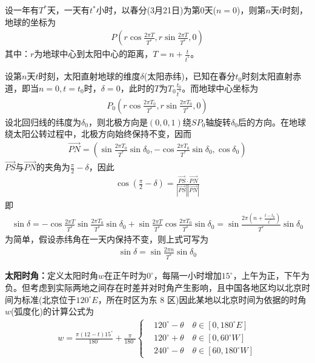             设一年有$T^*$天，一天有$t^*$小时，以春分(3月21日)为第0天($n=0$)，则第$n$天$t$时刻，地球的坐标为
            \begin{align*}
            P(r\cos\frac{2\pi T}{T^*},r\sin \frac{2\pi T}{T^*},0)
            \end{align*}
            其中：$r$为地球中心到太阳中心的距离，$T = n+\frac{t}{t^*}$。
            \par
            设第$n$天$t$时刻，太阳直射地球的维度$\delta$(太阳赤纬)，已知在春分$t_0$时刻太阳直射赤道，即当$n=0,t=t_0$时，$\delta=0$，此时的$T$为$T_0\frac{t_0}{t^*}$。而地球中心坐标为
            \begin{align*}
            P_0(r\cos\frac{2\pi T_0}{T^*},r\sin \frac{2\pi T_0}{T^*},0)
            \end{align*}
            设北回归线的纬度为$\delta_0$，则北极方向是$(0,0,1)$绕$SP_0$轴旋转$\delta_0$后的方向。在地球绕太阳公转过程中，北极方向始终保持不变，因而
            \begin{align*}
            \overrightarrow{PN} = \left( \sin \frac{2\pi T_0}{T^*}\sin\delta_0,-\cos\frac{2\pi T_0}{T^*}\sin\delta_0,\cos\delta_0 \right)
            \end{align*}
            $\overrightarrow{PS}$与$\overrightarrow{PN}$的夹角为$\frac{\pi}{2}-\delta$，因此
            \begin{align*}
            \cos(\frac{\pi}{2}-\delta) = \frac{\overrightarrow{PS}\cdot\overrightarrow {PN}}{|\overrightarrow{PS}||\overrightarrow {PN}|}
            \end{align*}
            即
            \begin{align*}
            \sin\delta = -\cos\frac{2\pi T}{T^*}\sin\frac{2\pi T_0}{T^*}\sin\delta_0+\sin\frac{2\pi T}{T^*}\cos\frac{2\pi T_0}{T^*}\sin\delta_0 = \sin\frac{2\pi \left( n+\frac{t-t_0}{t^*} \right) }{T^*}\sin\delta_0
            \end{align*}
            为简单，假设赤纬角在一天内保持不变，则上式可写为
            \begin{align*}
            \sin\delta=\sin\frac{2\pi n}{T^*}\sin\delta_0
            \end{align*}
            \par
            \textbf{太阳时角：}定义太阳时角$w$在正午时为$0^\circ$，每隔一小时增加$15^\circ$，上午为正，下午为负。但考虑到实际两地之间存在时差并对时角产生影响，且中国各地区均以北京时间为标准(北京位于$120^\circ E$，所在时区为东 8 区)因此某地以北京时间为依据的时角$w$(弧度化)的计算公式为
            \begin{align*}
            w = \frac{\pi (12-t)15^\circ}{180^\circ}+\frac{\pi}{180^\circ}\left\{
            \begin{aligned}
            & 120^\circ-\theta \quad \theta\in [0,180^\circ E]\\
            & 120^\circ+\theta \quad \theta\in [0,60^\circ W]\\
            & 240^\circ-\theta \quad \theta\in [60,180^\circ W]
            \end{aligned}
            \right.
            \end{align*}
